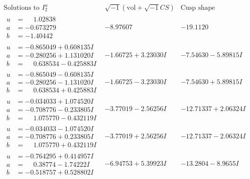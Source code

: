 \documentclass[1p]{elsarticle_modified}
\theoremstyle{definition}
\newcommand{\I}{\sqrt{-1}}
\begin{document}
$$\begin{array}{c|c|c}  
\text{Solutions to }I^u_{2}& \I (\text{vol} + \sqrt{-1}CS) & \text{Cusp shape}\\
 \hline 
\begin{aligned}
u &= \phantom{-}1.02838\phantom{ +0.000000I} \\
a &= -0.673279\phantom{ +0.000000I} \\
b &= -1.40442\phantom{ +0.000000I}\end{aligned}
 & -8.97607\phantom{ +0.000000I} & -19.1120\phantom{ +0.000000I} \\ \hline\begin{aligned}
u &= -0.865049 + 0.608135 I \\
a &= -0.280256 + 1.131020 I \\
b &= \phantom{-}0.638534 - 0.425883 I\end{aligned}
 & -1.66725 + 3.23030 I & -7.54630 - 5.89815 I \\ \hline\begin{aligned}
u &= -0.865049 - 0.608135 I \\
a &= -0.280256 - 1.131020 I \\
b &= \phantom{-}0.638534 + 0.425883 I\end{aligned}
 & -1.66725 - 3.23030 I & -7.54630 + 5.89815 I \\ \hline\begin{aligned}
u &= -0.034033 + 1.074520 I \\
a &= -0.708776 - 0.233805 I \\
b &= \phantom{-}1.075770 - 0.432119 I\end{aligned}
 & -3.77019 - 2.56256 I & -12.71337 + 2.06324 I \\ \hline\begin{aligned}
u &= -0.034033 - 1.074520 I \\
a &= -0.708776 + 0.233805 I \\
b &= \phantom{-}1.075770 + 0.432119 I\end{aligned}
 & -3.77019 + 2.56256 I & -12.71337 - 2.06324 I \\ \hline\begin{aligned}
u &= -0.764295 + 0.414957 I \\
a &= \phantom{-}0.38774 - 1.74222 I \\
b &= -0.518757 + 0.528802 I\end{aligned}
 & -6.94753 + 5.39923 I & -13.2804 - 8.9655 I \\ \hline\begin{aligned}

\end{aligned}
\end{array}$$
\end{document}
